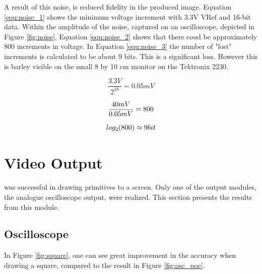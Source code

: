 A result of this noise, is reduced fidelity in the produced image. Equation \ref{equ:noise_1} shows the minimum voltage increment with 3.3V VRef and 16-bit data. 
Within the amplitude of the noise, captured on an oscilloscope, depicted in Figure \ref{fig:noise}, Equation \ref{equ:noise_2} shows that there coud be approximately 800 increments in voltage.
In Equation \ref{equ:noise_3} the number of "lost" increments is calculated to be about 9 bits.
This is a significant loss.
However this is barley visible on the small 8 by 10 cm monitor on the Tektronix 2230.

\begin{cequation}[H]
	\begin{equation}
		 \frac{3.3V}{2^{16}} = 0.05mV
		 	\end{equation}
	\label{equ:noise_1}
\end{cequation}
\begin{cequation}[H]
	\begin{equation}
		 \frac{40mV}{0.05mV} = 800 \\ 
		 	\end{equation}
	\label{equ:noise_2}
\end{cequation}
\begin{cequation}[H]
	\begin{equation}
		 log_2 ( 800 ) \approx 9 bit \\
	\end{equation}
	\label{equ:noise_3}
\end{cequation}



\section{Video Output}
\vthreek was successful in drawing primitives to a screen.
Only one of the output modules, the analogue oscilloscope output, were realized.
This section presents the results from this module.

\subsection{Oscilloscope}
In Figure \ref{fig:square}, one can see great improvement in the accuracy when drawing a square, compared to the result in Figure \ref{fig:osc_poc}.

